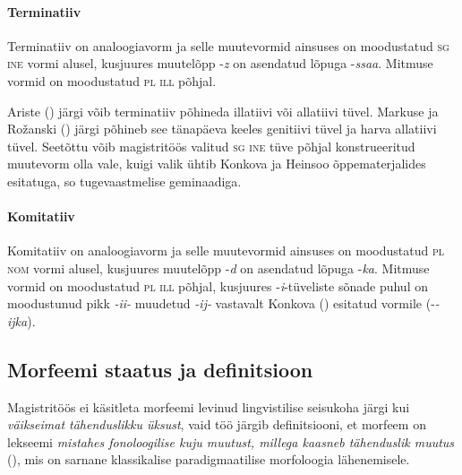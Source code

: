 \documentclass[12pt,a4paper]{article}
\newcommand{\msd}[1]{\textsc{#1}}
\begin{document}
\paragraph*{Terminatiiv}
Terminatiiv on analoogiavorm ja selle muutevormid ainsuses on moodustatud \msd{sg ine} vormi alusel, kusjuures muutelõpp -\textit{z} on asendatud lõpuga -\textit{ssaa}. Mitmuse vormid on moodustatud \msd{pl ill} põhjal.

Ariste (\citeyear[34]{ariste_grammar_1968}) järgi võib terminatiiv põhineda illatiivi või allatiivi tüvel. Markuse ja Rožanski (\citeyear[247]{markus_comitative_2014}) järgi põhineb see tänapäeva keeles genitiivi tüvel ja harva allatiivi tüvel. Seetõttu võib magistritöös valitud \msd{sg ine} tüve põhjal konstrueeritud muutevorm olla vale, kuigi valik ühtib Konkova ja Heinsoo õppe\-materjalides esitatuga, so tugeva\-astmelise geminaadiga.


\paragraph*{Komitatiiv}
Komitatiiv on analoogiavorm ja selle muutevormid ainsuses on moodustatud \msd{pl nom} vormi alusel, kusjuures muutelõpp -\textit{d} on asendatud lõpuga -\textit{ka}. Mitmuse vormid on moodustatud \msd{pl ill} põhjal, kusjuures -\textit{i}-tüveliste sõnade puhul on moodustunud pikk \textit{-ii-} muudetud \textit{-ij-} vastavalt Konkova (\citeyear[10]{konkova_vaddceeli_2014}) esitatud vormile (-\textit{-ijka}).






\subsection{Morfeemi staatus ja definitsioon}
\label{sec:morfeemi-staatus}


Magistritöös ei käsitleta morfeemi levinud lingvistilise seisukoha järgi kui \textit{väikseimat tähenduslikku üksust}, vaid töö järgib definitsiooni, et morfeem on lekseemi \textit{mistahes fonoloogilise kuju muutust, millega kaasneb tähenduslik muutus} (\cites[31]{beard_morpheme_1987}[49]{beard_lexeme-morpheme_1995}), %
mis on sarnane klassikalise paradigmaatilise morfoloogia lähenemisele.

\end{document}
